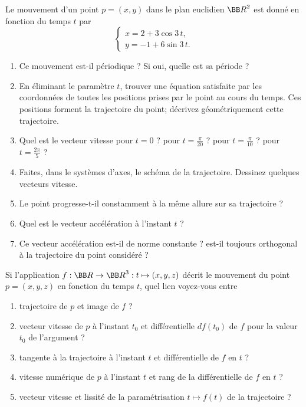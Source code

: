 \documentclass[12pt,french,oneside,a4paper]{memoir} %
\begin{document}
\begin{exo}
Le mouvement d'un point $p=(x,y)$ dans le plan euclidien ${\BB R}^2$ est donné en fonction du temps $t$ par
\begin{equation*}
\left\{
\begin{array}{l}
x=2+3 \cos 3\, t, \\
y = -1+6  \sin 3\,t.
\end{array}
\right.
\end{equation*}
\begin{enumerate}
\item Ce mouvement est-il périodique ? Si oui, quelle est sa période ? 
\item En éliminant le paramètre $t$, trouver une équation  satisfaite par
les coordonnées de toutes les positions prises par le point au cours du temps.
Ces positions forment la trajectoire du point; décrivez géométriquement cette
trajectoire. 
\item Quel est le vecteur vitesse pour $t=0$ ? pour $t =
\displaystyle{\frac{\pi}{20}}$ ? pour $\displaystyle{t= \frac{\pi}{10}}$ ? pour
$\displaystyle{t= \frac{2 \pi}{5}}$ ? 
\item Faites, dans le systèmes d'axes, le schéma de la trajectoire.
Dessinez quelques vecteurs vitesse. 
\item Le point progresse-t-il constamment à la même allure sur sa
trajectoire ?
\item Quel est le vecteur accélération à l'instant $t$ ?
\item Ce vecteur accélération est-il de norme constante ? est-il toujours
orthogonal à la trajectoire du point considéré ? 
\end{enumerate}
\end{exo}
\begin{exo}
Si l'application $f : {\BB R} \rightarrow {\BB R}^3 : t \mapsto (x,y,z)$
décrit le mouvement du point $p=(x,y,z)$ en fonction du temps $t$, quel lien
voyez-vous entre
\begin{enumerate}
\item trajectoire de $p$ et image de $f$ ?
\item vecteur vitesse de $p$ à l'instant $t_0$ et différentielle $df(t_0)$
de $f$ pour la valeur $t_0$ de l'argument ?
\item tangente à la trajectoire à l'instant $t$ et différentielle de $f$ en
$t$ ?
\item vitesse numérique de $p$ à l'instant $t$ et rang de la différentielle
de $f$ en $t$ ?
\item vecteur vitesse et lissité de la paramétrisation $t \mapsto f(t)$ de
la trajectoire ?
\end{enumerate}
\end{exo}
\end{document}
